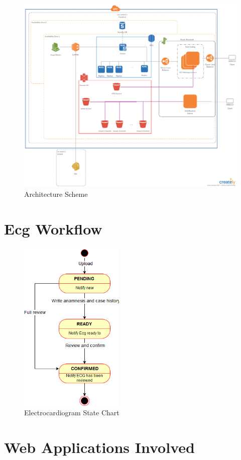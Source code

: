 \begin{figure}[h]
    \includegraphics[width=\textwidth]{architecture}
    \caption{Architecture Scheme}
    \label{fig:architecture}
\end{figure}
\section{Ecg Workflow}
\begin{figure}[h]
    \includegraphics[width=5cm]{ECGstatechart}
    \caption{Electrocardiogram State Chart}
    \label{fig:ECGstatechart}
\end{figure}
\section{Web Applications Involved}
